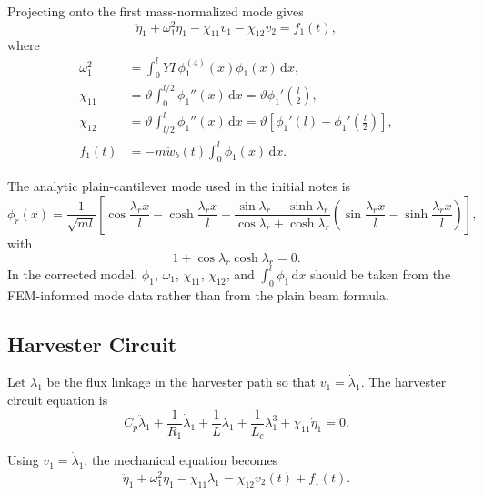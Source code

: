 \documentclass[11pt]{article}
\newcommand{\dd}{\mathrm{d}}
\begin{document}
Projecting onto the first mass-normalized mode gives
\begin{equation}
  \ddot \eta_1+\omega_1^2\eta_1-\chi_{11}v_1-\chi_{12}v_2=f_1(t),
  \label{eq:dim_mech_voltage}
\end{equation}
where
\begin{align}
  \omega_1^2
  &=\int_0^l YI\,\phi_1^{(4)}(x)\phi_1(x)\,\dd x,\\
  \chi_{11}
  &=\vartheta\int_0^{l/2}\phi_1''(x)\,\dd x
    =\vartheta\phi_1'\!\left(\frac{l}{2}\right),\\
  \chi_{12}
  &=\vartheta\int_{l/2}^{l}\phi_1''(x)\,\dd x
    =\vartheta\left[\phi_1'(l)-\phi_1'\!\left(\frac{l}{2}\right)\right],\\
  f_1(t)
  &=-m\ddot w_b(t)\int_0^l \phi_1(x)\,\dd x.
\end{align}

The analytic plain-cantilever mode used in the initial notes is
\begin{equation}
  \phi_r(x)=\frac{1}{\sqrt{ml}}\left[
  \cos\frac{\lambda_r x}{l}-\cosh\frac{\lambda_r x}{l}
  +\frac{\sin\lambda_r-\sinh\lambda_r}{\cos\lambda_r+\cosh\lambda_r}
  \left(\sin\frac{\lambda_r x}{l}-\sinh\frac{\lambda_r x}{l}\right)
  \right],
\end{equation}
with
\begin{equation}
  1+\cos\lambda_r\cosh\lambda_r=0.
\end{equation}
In the corrected model, $\phi_1$, $\omega_1$, $\chi_{11}$, $\chi_{12}$, and
$\int_0^l\phi_1\,\dd x$ should be taken from the FEM-informed mode data rather
than from the plain beam formula.

\subsection{Harvester Circuit}

Let $\lambda_1$ be the flux linkage in the harvester path so that
$v_1=\dot\lambda_1$.  The harvester circuit equation is
\begin{equation}
  C_p\ddot\lambda_1
  +\frac{1}{R_1}\dot\lambda_1
  +\frac{1}{L}\lambda_1
  +\frac{1}{L_c}\lambda_1^3
  +\chi_{11}\dot\eta_1
  =0.
  \label{eq:dim_circuit}
\end{equation}

Using $v_1=\dot\lambda_1$, the mechanical equation becomes
\begin{equation}
  \ddot \eta_1+\omega_1^2\eta_1-\chi_{11}\dot\lambda_1
  =
  \chi_{12}v_2(t)+f_1(t).
  \label{eq:dim_mech_flux}
\end{equation}
\end{document}
